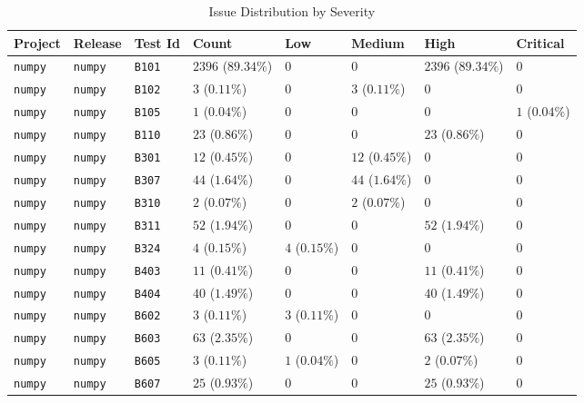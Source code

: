\begin{table}
\caption{Issue Distribution by Severity}
\label{tab:issue-distribution}
\begin{tabular}{llllllll}
\toprule
Project & Release & Test Id & Count & Low & Medium & High & Critical \\
\midrule
\texttt{numpy} & \texttt{numpy} & \texttt{B101} & $2396$ ($89.34\%$) & $0$ & $0$ & $2396$ ($89.34\%$) & $0$ \\
\texttt{numpy} & \texttt{numpy} & \texttt{B102} & $3$ ($0.11\%$) & $0$ & $3$ ($0.11\%$) & $0$ & $0$ \\
\texttt{numpy} & \texttt{numpy} & \texttt{B105} & $1$ ($0.04\%$) & $0$ & $0$ & $0$ & $1$ ($0.04\%$) \\
\texttt{numpy} & \texttt{numpy} & \texttt{B110} & $23$ ($0.86\%$) & $0$ & $0$ & $23$ ($0.86\%$) & $0$ \\
\texttt{numpy} & \texttt{numpy} & \texttt{B301} & $12$ ($0.45\%$) & $0$ & $12$ ($0.45\%$) & $0$ & $0$ \\
\texttt{numpy} & \texttt{numpy} & \texttt{B307} & $44$ ($1.64\%$) & $0$ & $44$ ($1.64\%$) & $0$ & $0$ \\
\texttt{numpy} & \texttt{numpy} & \texttt{B310} & $2$ ($0.07\%$) & $0$ & $2$ ($0.07\%$) & $0$ & $0$ \\
\texttt{numpy} & \texttt{numpy} & \texttt{B311} & $52$ ($1.94\%$) & $0$ & $0$ & $52$ ($1.94\%$) & $0$ \\
\texttt{numpy} & \texttt{numpy} & \texttt{B324} & $4$ ($0.15\%$) & $4$ ($0.15\%$) & $0$ & $0$ & $0$ \\
\texttt{numpy} & \texttt{numpy} & \texttt{B403} & $11$ ($0.41\%$) & $0$ & $0$ & $11$ ($0.41\%$) & $0$ \\
\texttt{numpy} & \texttt{numpy} & \texttt{B404} & $40$ ($1.49\%$) & $0$ & $0$ & $40$ ($1.49\%$) & $0$ \\
\texttt{numpy} & \texttt{numpy} & \texttt{B602} & $3$ ($0.11\%$) & $3$ ($0.11\%$) & $0$ & $0$ & $0$ \\
\texttt{numpy} & \texttt{numpy} & \texttt{B603} & $63$ ($2.35\%$) & $0$ & $0$ & $63$ ($2.35\%$) & $0$ \\
\texttt{numpy} & \texttt{numpy} & \texttt{B605} & $3$ ($0.11\%$) & $1$ ($0.04\%$) & $0$ & $2$ ($0.07\%$) & $0$ \\
\texttt{numpy} & \texttt{numpy} & \texttt{B607} & $25$ ($0.93\%$) & $0$ & $0$ & $25$ ($0.93\%$) & $0$ \\
\bottomrule
\end{tabular}
\end{table}
